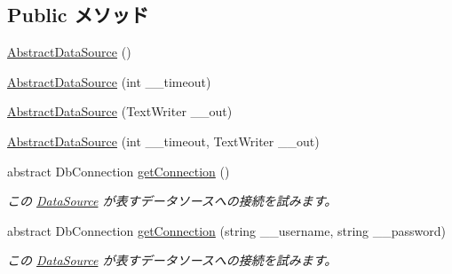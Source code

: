 \subsection*{Public メソッド}
\begin{DoxyCompactItemize}
\item 
\hyperlink{classlazurite_1_1relation_1_1common_1_1_abstract_data_source_a8c31edb7b217d4855f9dc2758146a507}{AbstractDataSource} ()
\item 
\hyperlink{classlazurite_1_1relation_1_1common_1_1_abstract_data_source_a92f48ab543e60a20650ef38608963841}{AbstractDataSource} (int \_\-\_\-timeout)
\item 
\hyperlink{classlazurite_1_1relation_1_1common_1_1_abstract_data_source_aa8f022e7998eff1fb34d3d8dd7c38d39}{AbstractDataSource} (TextWriter \_\-\_\-out)
\item 
\hyperlink{classlazurite_1_1relation_1_1common_1_1_abstract_data_source_af8a94afbb778766307e208473fe3fa0f}{AbstractDataSource} (int \_\-\_\-timeout, TextWriter \_\-\_\-out)
\item 
abstract DbConnection \hyperlink{classlazurite_1_1relation_1_1common_1_1_abstract_data_source_a1706b5b8821b00ad2391dd0fcf98a767}{getConnection} ()
\begin{DoxyCompactList}\small\item\em この \hyperlink{interfacelazurite_1_1relation_1_1common_1_1_data_source}{DataSource} が表すデータソースへの接続を試みます。 \item\end{DoxyCompactList}\item 
abstract DbConnection \hyperlink{classlazurite_1_1relation_1_1common_1_1_abstract_data_source_a1e828b5e7c1e29b21439d910f05005aa}{getConnection} (string \_\-\_\-username, string \_\-\_\-password)
\begin{DoxyCompactList}\small\item\em この \hyperlink{interfacelazurite_1_1relation_1_1common_1_1_data_source}{DataSource} が表すデータソースへの接続を試みます。 \item\end{DoxyCompactList}\end{DoxyCompactItemize}
